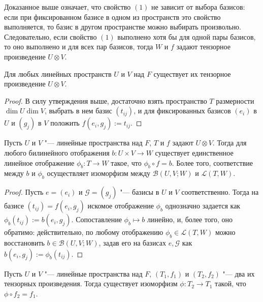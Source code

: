 \begin{note}
	Доказанное выше означает, что свойство $(1)$ не зависит от выбора базисов: если при фиксированном базисе в одном из пространств это свойство выполняется, то базис в другом пространстве можно выбирать произвольно. Следовательно, если свойство $(1)$ выполнено хотя бы для одной пары базисов, то оно выполнено и для всех пар базисов, тогда $W$ и $f$ задают тензорное произведение $U \otimes V$.
\end{note}

\begin{corollary}
	Для любых линейных пространств $U$ и $V$ над $F$ существует их тензорное произведение $U \otimes V$.
\end{corollary}

\begin{proof}
	В силу утверждения выше, достаточно взять пространство $T$ размерности $\dim{U}\dim{V}$, выбрать в нем базис $({t_{ij}})$, и для фиксированных базисов $({e_i})$ в $U$ и $({g_j})$ в $V$ положить $f({e_i}, {g_j}) := {t_{ij}}$.
\end{proof}

\begin{theorem}
	Пусть $U$ и $V$ "--- линейные пространства над $F$, $T$ и $f$ задают $U \otimes V$. Тогда для любого билинейного отображения $b: U \times V \rightarrow W$ существует единственное линейное отображение $\phi_b: T \rightarrow W$ такое, что $\phi_b \circ f = b$. Более того, соответствие между $b$ и $\phi_b$ осуществляет изоморфизм между $\mathcal{B}(U, V; W)$ и $\mathcal{L}(T, W)$.
\end{theorem}

\begin{proof}
	Пусть $e = ({e_i})$ и $\mathcal{G} = ({g_j})$ "--- базисы в $U$ и $V$ соответственно. Тогда на базисе $(t_{ij}) = f({e_i}, {g_j})$ искомое отображение $\phi_b$ однозначно задается как $\phi_b({t_{ij}}) := b({e_i}, {g_j})$. Сопоставление $\phi_b \mapsto b$ линейно, и, более того, оно обратимо: действительно, по любому отображению $\phi_b \in \mathcal{L}(T, W)$ можно восстановить $b \in \mathcal{B}(U, V; W)$, задав его на базисах $e, \mathcal{G}$ как $b({e_i}, {g_j}) := \phi_b({t_{ij}})$.
\end{proof}

\begin{corollary}
	Пусть $U$ и $V$ "--- линейные пространства над $F$, $(T_1, f_1)$ и $(T_2, f_2)$ "--- два их тензорных произведения. Тогда существует изоморфизм $\phi: T_2 \rightarrow T_1$ такой, что $\phi \circ f_2 = f_1$.
\end{corollary}

